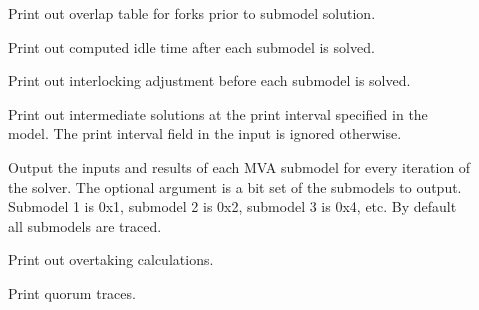 \begin{description}
\begin{description}
\item[]
Print out overlap table for forks prior to submodel solution.
\item[]
Print out computed idle time after each submodel is solved.
\item[]
Print out interlocking adjustment before each submodel is solved.
\item[]
Print out intermediate solutions at the print interval specified in the model.
The print interval field in the input is ignored otherwise.
\item[]
Output the inputs and results of each MVA submodel for every iteration of the solver.
The optional argument is a bit set of the submodels to output.  Submodel 1 is 0x1, 
submodel 2 is 0x2, submodel 3 is 0x4, etc.  By default all submodels are traced.
\item[]
Print out overtaking calculations.
\item[]
Print quorum traces.
\item[]


\end{description}
\end{description}

